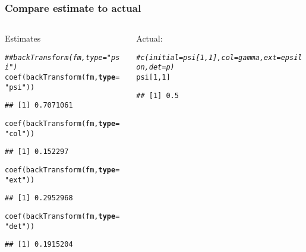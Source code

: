 \documentclass[color=usenames,dvipsnames]{beamer}\usepackage[]{graphicx}\usepackage[]{color}
\makeatletter
\newcommand{\hlnum}[1]{\textcolor[rgb]{0.69,0.494,0}{#1}}%
\newcommand{\hlstr}[1]{\textcolor[rgb]{0.749,0.012,0.012}{#1}}%
\newcommand{\hlcom}[1]{\textcolor[rgb]{0.514,0.506,0.514}{\textit{#1}}}%
\newcommand{\hlstd}[1]{\textcolor[rgb]{0,0,0}{#1}}%
\newcommand{\hlkwc}[1]{\textcolor[rgb]{0,0,0}{\textbf{#1}}}%
\newcommand{\hlkwd}[1]{\textcolor[rgb]{0.004,0.004,0.506}{#1}}%
\newenvironment{kframe}{%
 \def\at@end@of@kframe{}%
 \ifinner\ifhmode%
  \def\at@end@of@kframe{\end{minipage}}%
  \begin{minipage}{\columnwidth}%
 \fi\fi%
 \def\FrameCommand##1{\hskip\@totalleftmargin \hskip-\fboxsep
 \colorbox{shadecolor}{##1}\hskip-\fboxsep
     \hskip-\linewidth \hskip-\@totalleftmargin \hskip\columnwidth}%
 \MakeFramed {\advance\hsize-\width
   \@totalleftmargin\z@ \linewidth\hsize
   \@setminipage}}%
 {\par\unskip\endMakeFramed%
 \at@end@of@kframe}
\newenvironment{knitrout}{}{} %
\makeatother
\begin{document}
\begin{frame}[fragile]
  \frametitle{Compare estimate to actual}
  \begin{columns}
    \begin{column}{0.5\textwidth}
    Estimates
\begin{knitrout}\tiny
{}\color{fgcolor}\begin{kframe}
\begin{alltt}
\hlcom{## backTransform(fm, type="psi")}
\hlkwd{coef}\hlstd{(}\hlkwd{backTransform}\hlstd{(fm,} \hlkwc{type}\hlstd{=}\hlstr{"psi"}\hlstd{))}
\end{alltt}
\begin{verbatim}
## [1] 0.7071061
\end{verbatim}
\begin{alltt}
\hlkwd{coef}\hlstd{(}\hlkwd{backTransform}\hlstd{(fm,} \hlkwc{type}\hlstd{=}\hlstr{"col"}\hlstd{))}
\end{alltt}
\begin{verbatim}
## [1] 0.152297
\end{verbatim}
\begin{alltt}
\hlkwd{coef}\hlstd{(}\hlkwd{backTransform}\hlstd{(fm,} \hlkwc{type}\hlstd{=}\hlstr{"ext"}\hlstd{))}
\end{alltt}
\begin{verbatim}
## [1] 0.2952968
\end{verbatim}
\begin{alltt}
\hlkwd{coef}\hlstd{(}\hlkwd{backTransform}\hlstd{(fm,} \hlkwc{type}\hlstd{=}\hlstr{"det"}\hlstd{))}
\end{alltt}
\begin{verbatim}
## [1] 0.1915204
\end{verbatim}
\end{kframe}
\end{knitrout}
    \end{column}
    \begin{column}{0.5\textwidth}
      Actual:
\begin{knitrout}\tiny
{}\color{fgcolor}\begin{kframe}
\begin{alltt}
\hlcom{#c(initial=psi[1,1], col=gamma, ext=epsilon, det=p)}
\hlstd{psi[}\hlnum{1}\hlstd{,}\hlnum{1}\hlstd{]}
\end{alltt}
\begin{verbatim}
## [1] 0.5
\end{verbatim}

\end{kframe}
\end{knitrout}
\end{column}
\end{columns}
\end{frame}
\end{document}
